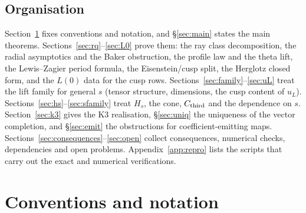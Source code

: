 \subsection{Organisation}
Section~\ref{sec:conv} fixes conventions and notation, and \S\ref{sec:main} states the main theorems. Sections~\ref{sec:rq}--\ref{sec:L0} prove them:
the ray class decomposition, the radial asymptotics and the Baker obstruction, the profile law and the theta lift, the Lewis--Zagier period formula,
the Eisenstein/cusp split, the Herglotz closed form, and the $L(0)$ data for the cusp rows. Sections~\ref{sec:family}--\ref{sec:uL} treat the lift
family for general $s$ (tensor structure, dimensions, the cusp content of $u_L$). Sections~\ref{sec:hs}--\ref{sec:sfamily} treat $H_s$, the cone, $C_{\mathrm{third}}$
and the dependence on $s$. Section~\ref{sec:k3} gives the K3 realisation, \S\ref{sec:uniq} the uniqueness of the vector completion, and \S\ref{sec:emit}
the obstructions for coefficient-emitting maps. Sections~\ref{sec:consequences}--\ref{sec:open} collect consequences, numerical checks, dependencies
and open problems. Appendix~\ref{app:repro} lists the scripts that carry out the exact and numerical verifications.

\section{Conventions and notation}\label{sec:conv}

